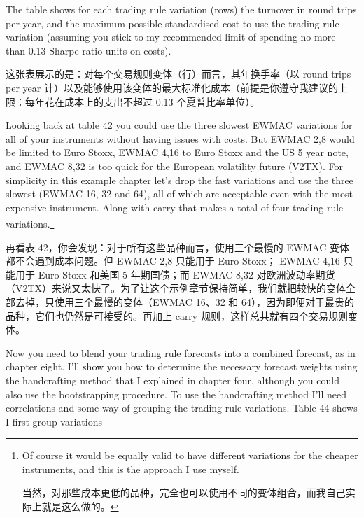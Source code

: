\begin{englishblock} The table shows for each trading rule variation (rows) the turnover in round trips per year, and the maximum possible standardised cost to use the trading rule variation (assuming you stick to my recommended limit of spending no more than 0.13 Sharpe ratio units on costs). \end{englishblock}

\begin{chineseblock}这张表展示的是：对每个交易规则变体（行）而言，其年换手率（以 round trips per year 计）以及能够使用该变体的最大标准化成本（前提是你遵守我建议的上限：每年花在成本上的支出不超过 0.13 个夏普比率单位）。\end{chineseblock}

\bipairgap

\begin{englishblock} Looking back at table 42 you could use the three slowest EWMAC variations for all of your instruments without having issues with costs. But EWMAC 2,8 would be limited to Euro Stoxx, EWMAC 4,16 to Euro Stoxx and the US 5 year note, and EWMAC 8,32 is too quick for the European volatility future (V2TX). For simplicity in this example chapter let's drop the fast variations and use the three slowest (EWMAC 16, 32 and 64), all of which are acceptable even with the most expensive instrument. Along with carry that makes a total of four trading rule variations.\footnote{Of course it would be equally valid to have different variations for the cheaper instruments, and this is the approach I use myself. \par 当然，对那些成本更低的品种，完全也可以使用不同的变体组合，而我自己实际上就是这么做的。}\end{englishblock}

\begin{chineseblock}再看表 42，你会发现：对于所有这些品种而言，使用三个最慢的 EWMAC 变体都不会遇到成本问题。但 EWMAC 2,8 只能用于 Euro Stoxx； EWMAC 4,16 只能用于 Euro Stoxx 和美国 5 年期国债；而 EWMAC 8,32 对欧洲波动率期货（V2TX）来说又太快了。为了让这个示例章节保持简单，我们就把较快的变体全部去掉，只使用三个最慢的变体（EWMAC 16、32 和 64），因为即便对于最贵的品种，它们也仍然是可接受的。再加上 carry 规则，这样总共就有四个交易规则变体。\end{chineseblock}


\begin{englishblock} Now you need to blend your trading rule forecasts into a combined forecast, as in chapter eight. I'll show you how to determine the necessary forecast weights using the handcrafting method that I explained in chapter four, although you could also use the bootstrapping procedure. To use the handcrafting method I'll need correlations and some way of grouping the trading rule variations. Table 44 shows I first group variations \end{englishblock}

